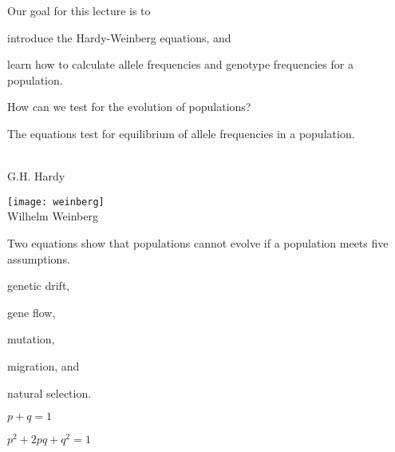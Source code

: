 \documentclass[t,handout]{beamer}  %
\begin{document}
\begin{frame}{Our goal for this lecture is to}
	
	\hangpara introduce the Hardy-Weinberg equations, and 
	
	\hangpara learn how to calculate allele frequencies and genotype frequencies for a population. 
	
	\vspace*{2\baselineskip}
	
	\hangpara How can we test for the evolution of populations?
	
\end{frame}
%

\begin{frame}[t]{The  equations test for equilibrium of allele frequencies in a population.}

	\vspace*{-\baselineskip}
	
	\begin{multicols}{2}
	
		{\centering {}\\
		G.H. Hardy\par
		}
		
	\columnbreak
	
		{\centering \texttt{[image: weinberg]}\\
		Wilhelm Weinberg\par
		}
		
	\end{multicols}
	
\end{frame}

\begin{frame}[t]{Two equations show that populations cannot evolve if a population meets five assumptions.}

	\vspace*{-\baselineskip}
	
	\begin{multicols}{2}

	\hangpara {} genetic drift,
	
	\hangpara {} gene flow,

	\hangpara {} mutation,
	
	\hangpara {} migration, and
	
	\hangpara {} natural selection.
	
	\columnbreak

	\hangpara $p + q = 1$
	
	\hangpara $p^2 + 2pq + q^2 = 1$
	
	\end{multicols}

\end{frame}
\end{document}
